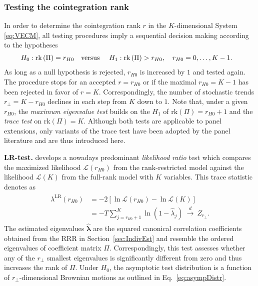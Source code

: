 \subsubsection{Testing the cointegration rank} \label{sec:IndivTest}
In order to determine the cointegration rank $ r $ in the $ K $-dimensional System \eqref{eq:VECM}, all testing procedures imply a sequential decision making according to the hypotheses 
\begin{align} \label{eq:RankHypo}
\begin{split}
	H_0: \text{rk}\left( \Pi \right) = r_{H0} & \text{\quad versus \quad} H_1: \text{rk} \left( \Pi \right) > r_{H0}, \quad r_{H0}=0, \ldots, K-1.
\end{split}
\end{align}
As long as a null hypothesis is rejected, $r_{H0}$ is increased by $1$ and tested again. The procedure stops for an accepted $ r = r_{H0} $ or if the maximal $r_{H0} = K - 1$ has been rejected in favor of $ r = K $. Correspondingly, the number of stochastic trends $ r_\perp = K - r_{H0} $ declines in each step from $K$ down to $1$. Note that, under a given $r_{H0}$, the \textit{maximum eigenvalue test} builds on the $ H_ 1 $ of $ \text{rk}(\Pi) = r_{H0} + 1 $ and the \textit{trace test} on $ \text{rk}(\Pi) = K $. Although both tests are applicable to panel extensions, only variants of the trace test have been adopted by the panel literature and are thus introduced here.


\textbf{LR-test.} \citet{Johansen1988} develops a nowadays predominant \textit{likelihood ratio} test which compares the maximized likelihood $ \mathcal{L}(r_{H0}) $ from the rank-restricted model against the likelihood $ \mathcal{L}(K) $ from the full-rank model with $ K $ variables. This trace statistic denotes as
\begin{align} \label{eq:LRrank}
\begin{split}
	\lambda^{\text{LR}} \left( r_{H0} \right) & = -2 \left[ \ln \mathcal{L}(r_{H0}) - \ln \mathcal{L}(K) \right] \\
	& = -T \sum_{j=r_{H0}+1}^{K} \ln(1-\hat{\lambda}_j) \ \overset{d}{\longrightarrow} \ Z_{r_\perp}. 
\end{split}
\end{align}
The estimated eigenvalues $ \boldsymbol{\hat{\lambda}} $ are the squared canonical correlation coefficients obtained from the RRR in Section~\ref{sec:IndivEst} and resemble the ordered eigenvalues of coefficient matrix $ \Pi $. Correspondingly, this test assesses whether any of the $ r_\perp $ smallest eigenvalues is significantly different from zero and thus increases the rank of $ \Pi $. Under $ H_0 $, the asymptotic test distribution is a function of $ r_\perp $-dimensional Brownian motions as outlined in Eq.~\eqref{eq:asympDistr}.


